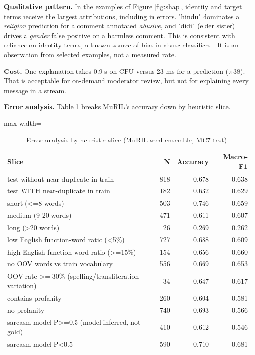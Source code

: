 \documentclass[10pt,twocolumn]{article}
\begin{document}
\textbf{Qualitative pattern.} In the examples of Figure \ref{fig:shap}, identity and target terms receive the largest
attributions, including in errors. "hindu" dominates a \emph{religion} prediction for a comment annotated \emph{abusive}, and "didi"
(elder sister) drives a \emph{gender} false positive on a harmless comment. This is consistent with reliance on identity terms,
a known source of bias in abuse classifiers \cite{sap2019racial}. It is an observation from selected examples, not a
measured rate.

\textbf{Cost.} One explanation takes 0.9 s on CPU versus 23 ms for a prediction ($\times$38).
That is acceptable for on-demand moderator review, but not for explaining every message in a stream.

\textbf{Error analysis.} Table \ref{tab:errors} breaks MuRIL's accuracy down by heuristic slice.

\begin{table}[t]
\centering
\small
\caption{Error analysis by heuristic slice (MuRIL seed ensemble, MC7 test).}
\label{tab:errors}
\begin{adjustbox}{max width=\textwidth}\begin{tabular}{lrrr}
\toprule
Slice & N & Accuracy & Macro-F1 \\
\midrule
test without near-duplicate in train & 818 & 0.678 & 0.638 \\
test WITH near-duplicate in train & 182 & 0.632 & 0.629 \\
short (<=8 words) & 503 & 0.746 & 0.659 \\
medium (9-20 words) & 471 & 0.611 & 0.607 \\
long (>20 words) & 26 & 0.269 & 0.262 \\
low English function-word ratio (<5\%) & 727 & 0.688 & 0.609 \\
high English function-word ratio (>=15\%) & 154 & 0.656 & 0.660 \\
no OOV words vs train vocabulary & 556 & 0.669 & 0.653 \\
OOV rate >= 30\% (spelling/transliteration variation) & 34 & 0.647 & 0.617 \\
contains profanity & 260 & 0.604 & 0.581 \\
no profanity & 740 & 0.693 & 0.566 \\
sarcasm model P>=0.5 (model-inferred, not gold) & 410 & 0.612 & 0.546 \\
sarcasm model P<0.5 & 590 & 0.710 & 0.681 \\
\bottomrule
\end{tabular}\end{adjustbox}
\end{table}
\end{document}

